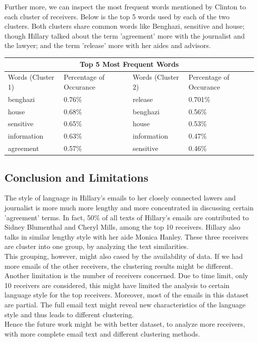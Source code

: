\documentclass[11pt,a4paper]{article}
\begin{document}
\newpage
Further more, we can inspect the most frequent words mentioned by Clinton to each cluster of receivers. Below is the top 5 words used by each of the two clusters. Both clusters share common words like Benghazi, sensitive and house; though Hillary talked about the term 'agreement' more with the journalist and the lawyer; and the term 'release' more with her aides and advisors. 
\\

\begin{center}
\begin{tabular}{ |p{3cm}|p{3cm}|| p{3cm}|p{3cm}|  }
 \hline
 \multicolumn{4}{|c|}{Top 5 Most Frequent Words} \\
 \hline
 Words (Cluster 1)  & Percentage of Occurance & Words (Cluster 2) & Percentage of Occurance\\
 \hline
 benghazi & 0.76\% & release  & 0.701\% \\
 house &  0.68\% & benghazi & 0.56\% \\
 sensitive & 0.65\% & house & 0.53\%\\
 information & 0.63\% & information & 0.47\%\\
 agreement & 0.57\% &  sensitive  & 0.46\% \\
 \hline
\end{tabular}
\end{center}

\newpage
\subsection*{Conclusion and Limitations}
The style of language in Hillary's emails to her closely connected lawers and journalist is more much more lengthy and more concentrated in discussing certain 'agreement' terms. In fact, 50\% of all texts of Hillary's emails are contributed to Sidney Blumenthal and Cheryl Mills, among the top 10 receivers. Hillary also talks in similar lengthy style with her aide Monica Hanley. These three receivers are cluster into one group, by analyzing the text similarities. 
\\
This grouping, however, might also cased by the availability of data. If we had more emails of the other receivers, the clustering results might be different. Another limitation is the number of receivers concerned. Due to time limit, only 10 receivers are considered, this might have limited the analysis to certain language style for the top receivers. Moreover, most of the emails in this dataset are partial. The full email text might reveal new characteristics of the language style and thus leads to different clustering. \\
Hence the future work might be with better dataset, to analyze more receivers, with more complete email text and different clustering methods.
\end{document}
